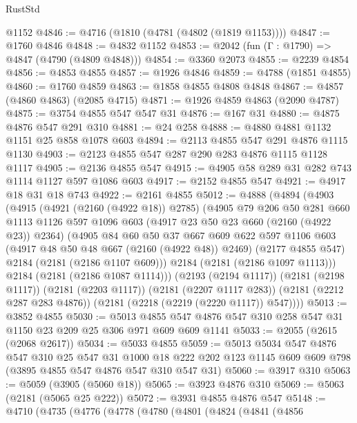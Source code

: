 \begin{lexlean}{RustStd}
\begin{coremodule}
    @1152
@4846 := @4716 (@1810 (@4781 (@4802 (@1819 @1153))))
@4847 := @1760 @4846
@4848 := @4832 @1152
@4853 := @2042 (fun (Γ : @1790) => @4847 (@4790 (@4809 @4848)))
@4854 := @3360 @2073
@4855 := @2239 @4854
@4856 := @4853 @4855
@4857 := @1926 @4846
@4859 := @4788 (@1851 @4855)
@4860 := @1760 @4859
@4863 := @1858 @4855 @4808 @4848
@4867 := @4857 (@4860 @4863) (@2085 @4715)
@4871 := @1926 @4859 @4863 (@2090 @4787)
@4875 := @3754 @4855 @547 @547 @31
@4876 := @167 @31
@4880 := @4875 @4876 @547 @291 @310
@4881 := @24 @258
@4888 := @4880 @4881 @1132 @1151 @25 @858 @1078 @603
@4894 := @2113 @4855 @547 @291 @4876 @1115 @1130
@4903 := @2123 @4855 @547 @287 @290 @283 @4876 @1115 @1128 @1117
@4905 := @2136 @4855 @547
@4915 := @4905 @58 @289 @31 @282 @743 @1114 @1127 @597 @1086 @603
@4917 := @2152 @4855 @547
@4921 := @4917 @18 @31 @18 @743
@4922 := @2161 @4855
@5012 := @4888
    (@4894
      (@4903
        (@4915
          (@4921 (@2160 (@4922 @18)) @2785)
          (@4905
            @79
            @206
            @50
            @281
            @660
            @1113
            @1126
            @597
            @1096
            @603
            (@4917 @23 @50 @23 @660 (@2160 (@4922 @23)) @2364)
            (@4905
              @84
              @60
              @50
              @37
              @667
              @609
              @622
              @597
              @1106
              @603
              (@4917 @48 @50 @48 @667 (@2160 (@4922 @48)) @2469)
              (@2177 @4855 @547)
              @2184
              (@2181 (@2186 @1107 @609)))
            @2184
            (@2181 (@2186 @1097 @1113)))
          @2184
          (@2181 (@2186 @1087 @1114)))
        (@2193 (@2194 @1117))
        (@2181 (@2198 @1117))
        (@2181 (@2203 @1117))
        (@2181 (@2207 @1117 @283))
        (@2181 (@2212 @287 @283 @4876))
        (@2181 (@2218 (@2219 (@2220 @1117)) @547))))
@5013 := @3852 @4855
@5030 := @5013 @4855 @547 @4876 @547 @310 @258 @547 @31 @1150 @23 @209 @25 @306 @971 @609 @609 @1141
@5033 := @2055 (@2615 (@2068 @2617))
@5034 := @5033 @4855
@5059 := @5013
    @5034
    @547
    @4876
    @547
    @310
    @25
    @547
    @31
    @1000
    @18
    @222
    @202
    @123
    @1145
    @609
    @609
    @798
    (@3895 @4855 @547 @4876 @547 @310 @547 @31)
@5060 := @3917 @310
@5063 := @5059 (@3905 (@5060 @18))
@5065 := @3923 @4876 @310
@5069 := @5063 (@2181 (@5065 @25 @222))
@5072 := @3931 @4855 @4876 @547
@5148 := @4710
    (@4735
      (@4776
        (@4778
          (@4780
            (@4801
              (@4824
                (@4841
                  (@4856

\end{coremodule}
\end{lexlean}
